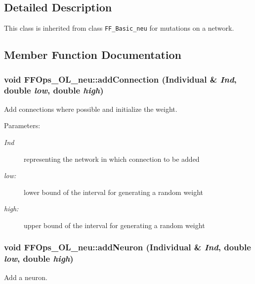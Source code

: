 \subsection{Detailed Description}
This class is inherited from class {\tt FF\_\-Basic\_\-neu} for mutations on a network.



\subsection{Member Function Documentation}
\subsubsection{\setlength{\rightskip}{0pt plus 5cm}void FFOps\_\-OL\_\-neu::add\-Connection (Individual \& {\em Ind}, double {\em low}, double {\em high})}\label{classFFOps__OL__neu_a1}


Add connections where possible and initialize the weight.

\begin{Desc}
\item[Parameters: ]\par
\begin{description}
\item[{\em 
Ind}]representing the network in which connection to be added \item[{\em 
low:}]lower bound of the interval for generating a random weight \item[{\em 
high:}]upper bound of the interval for generating a random weight \end{description}
\end{Desc}
\subsubsection{\setlength{\rightskip}{0pt plus 5cm}void FFOps\_\-OL\_\-neu::add\-Neuron (Individual \& {\em Ind}, double {\em low}, double {\em high})}\label{classFFOps__OL__neu_a4}


Add a neuron.

